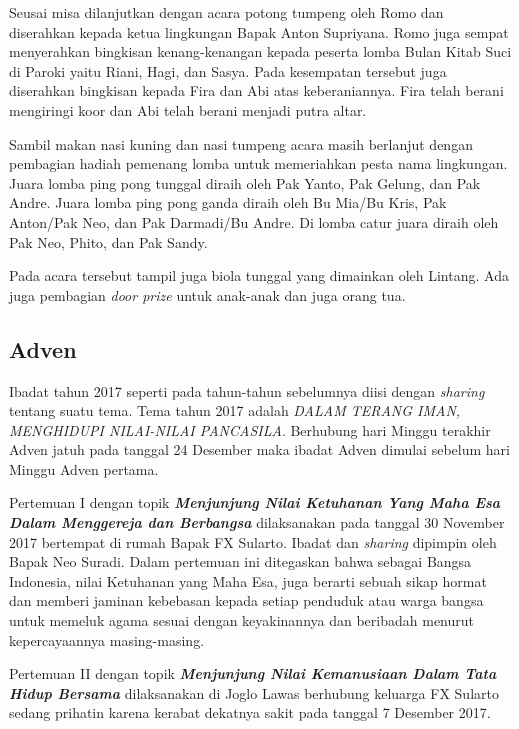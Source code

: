 Seusai misa dilanjutkan dengan acara potong tumpeng oleh Romo dan diserahkan kepada ketua lingkungan Bapak Anton Supriyana. Romo juga sempat menyerahkan bingkisan kenang-kenangan kepada peserta lomba Bulan Kitab Suci di Paroki yaitu Riani, Hagi, dan Sasya. Pada kesempatan tersebut juga diserahkan bingkisan kepada Fira dan Abi atas keberaniannya. Fira telah berani mengiringi koor dan Abi telah berani menjadi putra altar.

Sambil makan nasi kuning dan nasi tumpeng acara masih berlanjut dengan pembagian hadiah pemenang lomba untuk memeriahkan pesta nama lingkungan. Juara lomba ping pong tunggal diraih oleh Pak Yanto, Pak Gelung, dan Pak Andre. Juara lomba ping pong ganda diraih oleh Bu Mia/Bu Kris, Pak Anton/Pak Neo, dan Pak Darmadi/Bu Andre. Di lomba catur juara diraih oleh Pak Neo, Phito, dan Pak Sandy.

Pada acara tersebut tampil juga biola tunggal yang dimainkan oleh Lintang. Ada juga pembagian \textit{door prize} untuk anak-anak dan juga orang tua.

\subsection*{Adven}
Ibadat tahun 2017 seperti pada tahun-tahun sebelumnya diisi dengan \textit{sharing} tentang suatu tema.
Tema tahun 2017 adalah \textit{DALAM TERANG IMAN, MENGHIDUPI NILAI-NILAI PANCASILA}. 
Berhubung hari Minggu terakhir Adven jatuh pada tanggal 24 Desember maka ibadat Adven dimulai sebelum hari Minggu Adven pertama.

Pertemuan I
dengan topik \textit{\textbf{Menjunjung Nilai
Ketuhanan Yang Maha Esa
Dalam Menggereja dan
Berbangsa}}
dilaksanakan pada tanggal 30 November 2017 bertempat di rumah Bapak FX Sularto. Ibadat dan \textit{sharing} dipimpin oleh Bapak Neo Suradi. Dalam pertemuan ini ditegaskan bahwa sebagai Bangsa Indonesia, nilai Ketuhanan
yang Maha Esa, juga berarti sebuah sikap hormat dan
memberi jaminan kebebasan kepada setiap penduduk atau
warga bangsa untuk memeluk agama sesuai dengan
keyakinannya dan beribadah menurut kepercayaannya masing-masing.

Pertemuan II dengan topik \textit{\textbf{Menjunjung Nilai Kemanusiaan
		Dalam Tata Hidup Bersama
}} dilaksanakan di Joglo Lawas berhubung keluarga FX Sularto sedang prihatin karena kerabat dekatnya sakit pada tanggal 7 Desember 2017.

